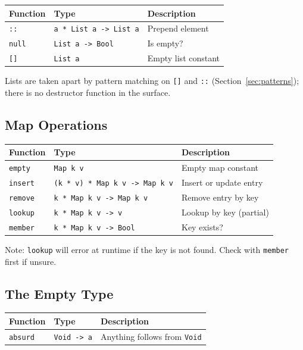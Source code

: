 \documentclass[11pt,a4paper]{article}
\newcommand{\cba}[1]{\lstinline[style=cbainline]{#1}}
\begin{document}
\begin{center}
\begin{tabular}{lll}
\toprule
\textbf{Function} & \textbf{Type} & \textbf{Description} \\
\midrule
\texttt{::}     & \texttt{a * List a -> List a}        & Prepend element \\
\texttt{null}   & \texttt{List a -> Bool}               & Is empty? \\
\texttt{[]}     & \texttt{List a}                       & Empty list constant \\
\bottomrule
\end{tabular}
\end{center}

Lists are taken apart by pattern matching on \cba{[]} and \cba{::}
(Section~\ref{sec:patterns}); there is no destructor function in the surface.

\subsection{Map Operations}

\begin{center}
\begin{tabular}{lll}
\toprule
\textbf{Function} & \textbf{Type} & \textbf{Description} \\
\midrule
\texttt{empty}  & \texttt{Map k v}                       & Empty map constant \\
\texttt{insert} & \texttt{(k * v) * Map k v -> Map k v} & Insert or update entry \\
\texttt{remove} & \texttt{k * Map k v -> Map k v}        & Remove entry by key \\
\texttt{lookup} & \texttt{k * Map k v -> v}              & Lookup by key (partial) \\
\texttt{member} & \texttt{k * Map k v -> Bool}           & Key exists? \\
\bottomrule
\end{tabular}
\end{center}

Note: \texttt{lookup} will error at runtime if the key is not found.
Check with \texttt{member} first if unsure.

\subsection{The Empty Type}

\begin{center}
\begin{tabular}{lll}
\toprule
\textbf{Function} & \textbf{Type} & \textbf{Description} \\
\midrule
\texttt{absurd} & \texttt{Void -> a} & Anything follows from \texttt{Void} \\
\bottomrule
\end{tabular}
\end{center}
\end{document}
